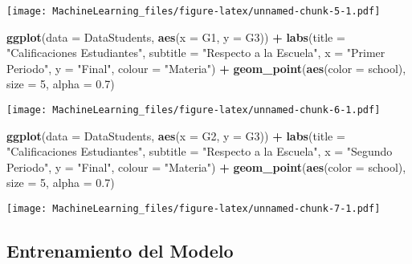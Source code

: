 \documentclass[
]{article}
\newenvironment{Shaded}{\begin{snugshade}}{\end{snugshade}}
\newcommand{\DataTypeTok}[1]{\textcolor[rgb]{0.13,0.29,0.53}{#1}}
\newcommand{\DecValTok}[1]{\textcolor[rgb]{0.00,0.00,0.81}{#1}}
\newcommand{\FloatTok}[1]{\textcolor[rgb]{0.00,0.00,0.81}{#1}}
\newcommand{\KeywordTok}[1]{\textcolor[rgb]{0.13,0.29,0.53}{\textbf{#1}}}
\newcommand{\NormalTok}[1]{#1}
\newcommand{\OperatorTok}[1]{\textcolor[rgb]{0.81,0.36,0.00}{\textbf{#1}}}
\newcommand{\StringTok}[1]{\textcolor[rgb]{0.31,0.60,0.02}{#1}}
\begin{document}
\texttt{[image: MachineLearning\_files/figure-latex/unnamed-chunk-5-1.pdf]}

\begin{Shaded}
\begin{Highlighting}[]
\KeywordTok{ggplot}\NormalTok{(}\DataTypeTok{data =}\NormalTok{ DataStudents, }\KeywordTok{aes}\NormalTok{(}\DataTypeTok{x =}\NormalTok{ G1, }\DataTypeTok{y =}\NormalTok{ G3)) }\OperatorTok{+}\StringTok{ }\KeywordTok{labs}\NormalTok{(}\DataTypeTok{title =} \StringTok{"Calificaciones Estudiantes"}\NormalTok{, }\DataTypeTok{subtitle =} \StringTok{"Respecto a la Escuela"}\NormalTok{,}
                                                        \DataTypeTok{x =} \StringTok{"Primer Periodo"}\NormalTok{, }\DataTypeTok{y =} \StringTok{"Final"}\NormalTok{, }\DataTypeTok{colour =} \StringTok{"Materia"}\NormalTok{) }\OperatorTok{+}
\StringTok{  }\KeywordTok{geom_point}\NormalTok{(}\KeywordTok{aes}\NormalTok{(}\DataTypeTok{color =}\NormalTok{ school), }\DataTypeTok{size =} \DecValTok{5}\NormalTok{, }\DataTypeTok{alpha =} \FloatTok{0.7}\NormalTok{)}
\end{Highlighting}
\end{Shaded}

\texttt{[image: MachineLearning\_files/figure-latex/unnamed-chunk-6-1.pdf]}

\begin{Shaded}
\begin{Highlighting}[]
\KeywordTok{ggplot}\NormalTok{(}\DataTypeTok{data =}\NormalTok{ DataStudents, }\KeywordTok{aes}\NormalTok{(}\DataTypeTok{x =}\NormalTok{ G2, }\DataTypeTok{y =}\NormalTok{ G3)) }\OperatorTok{+}\StringTok{ }\KeywordTok{labs}\NormalTok{(}\DataTypeTok{title =} \StringTok{"Calificaciones Estudiantes"}\NormalTok{, }\DataTypeTok{subtitle =} \StringTok{"Respecto a la Escuela"}\NormalTok{,}
                                                        \DataTypeTok{x =} \StringTok{"Segundo Periodo"}\NormalTok{, }\DataTypeTok{y =} \StringTok{"Final"}\NormalTok{, }\DataTypeTok{colour =} \StringTok{"Materia"}\NormalTok{) }\OperatorTok{+}
\StringTok{  }\KeywordTok{geom_point}\NormalTok{(}\KeywordTok{aes}\NormalTok{(}\DataTypeTok{color =}\NormalTok{ school), }\DataTypeTok{size =} \DecValTok{5}\NormalTok{, }\DataTypeTok{alpha =} \FloatTok{0.7}\NormalTok{)}
\end{Highlighting}
\end{Shaded}

\texttt{[image: MachineLearning\_files/figure-latex/unnamed-chunk-7-1.pdf]}

\hypertarget{entrenamiento-del-modelo}{%
\subsection{Entrenamiento del Modelo}\label{entrenamiento-del-modelo}}
\end{document}
